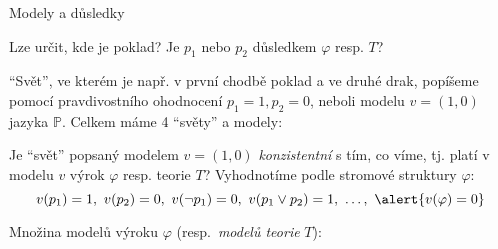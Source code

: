 \documentclass{beamer}
\begin{document}
\begin{frame}{Modely a důsledky}

    Lze určit, kde je poklad? Je $p_1$ nebo $p_2$ \alert{důsledkem} $\varphi$ resp. $T$?    

    \alert{``Svět''}, ve kterém je např. v první chodbě poklad a ve druhé drak, popíšeme pomocí \alert{pravdivostního ohodnocení} $p_1=1,p_2=0$, neboli \alert{modelu} $v=(1,0)$ jazyka $\mathbb P$. Celkem máme 4 ``světy'' a modely:

    \pause

    Je ``svět'' popsaný modelem $v = (1,0)$ \emph{konzistentní} s tím, co víme, tj. \alert{platí} v modelu $v$ výrok $\varphi$ resp. teorie $T$? Vyhodnotíme podle stromové struktury $\varphi$:
    $$
    v(p_1) = 1,\ v(p_2) = 0,\ v(\neg p_1) = 0,\ v(p_1 \lor p_2)=1,\ \dots,\ \alert{v(\varphi)=0}
    $$
    
    \pause

    Množina \alert{modelů výroku} \( \varphi \) (resp.\ \emph{modelů teorie} \( T \)):

    
\end{frame}
\end{document}
